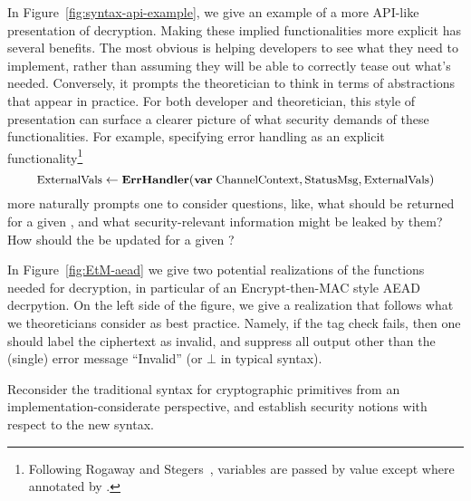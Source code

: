 In Figure~\ref{fig:syntax-api-example}, we give an example of a more
API-like presentation of decryption.
%
Making these implied functionalities more explicit has several benefits.  The
most obvious is helping developers to see what they need to implement, rather
than assuming they will be able to correctly tease out what's needed.
Conversely, it prompts the theoretician to think in terms of abstractions that
appear in practice.
%
For both developer and theoretician, this style of presentation can surface a
clearer picture of what security demands of these functionalities. For example,
specifying error handling as an explicit functionality\footnote{Following Rogaway and Stegers~\cite{RS09}, variables are
passed by value except where annotated by .}
\[
\textrm{\small ExternalVals} \gets
                                  \textrm{\small\bf ErrHandler}(\textrm{\small\bf var}\;
                                  \textrm{\small ChannelContext},
                                  \textrm{\small StatusMsg}, \textrm{\small ExternalVals})
\]
more naturally prompts one to consider questions, like, what  should
be returned for a given , and what
security-relevant information might be leaked by them?  How should the
 be updated for a given ?

In Figure~\ref{fig:EtM-aead} we give two potential realizations of the
functions needed for decryption, in particular of an Encrypt-then-MAC
style AEAD decrpytion.  On the left side of the figure, we
give a realization that follows what we theoreticians consider as best
practice.  Namely, if the tag check fails, then one should label the
ciphertext as invalid, and suppress all output other than the (single)
error message ``Invalid'' (or $\bot$ in typical syntax).





\begin{task}
{Reconsider the traditional syntax for cryptographic primitives from an implementation-considerate perspective, and establish security notions with respect to the new syntax. }
\end{task}

